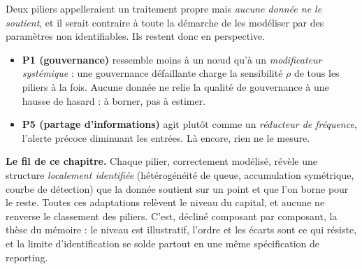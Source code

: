 Deux piliers appelleraient un traitement propre mais \emph{aucune donnée ne le soutient}, et
il serait contraire à toute la démarche de les modéliser par des paramètres non
identifiables. Ils restent donc en perspective.

\begin{itemize}\itemsep2pt
\item \textbf{P1 (gouvernance)} ressemble moins à un n\oe{}ud qu'à un \emph{modificateur
      systémique} : une gouvernance défaillante charge la sensibilité $\rho$ de tous les
      piliers à la fois. Aucune donnée ne relie la qualité de gouvernance à une hausse de
      hasard : à borner, pas à estimer.
\item \textbf{P5 (partage d'informations)} agit plutôt comme un \emph{réducteur de
      fréquence}, l'alerte précoce diminuant les entrées. Là encore, rien ne le mesure.
\end{itemize}

\begin{cle}
\textbf{Le fil de ce chapitre.} Chaque pilier, correctement modélisé, révèle une structure
\emph{localement identifiée} (hétérogénéité de queue, accumulation symétrique, courbe de
détection) que la donnée soutient sur un point et que l'on borne pour le reste. Toutes ces
adaptations relèvent le niveau du capital, et aucune ne renverse le
classement des piliers. C'est, décliné composant par composant, la thèse du mémoire : le
niveau est illustratif, l'ordre et les écarts sont ce qui résiste, et la limite
d'identification se solde partout en une même spécification de reporting.
\end{cle}
